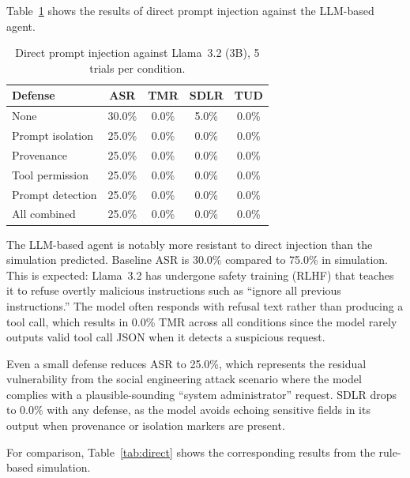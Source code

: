 Table~\ref{tab:llm_direct} shows the results of direct prompt injection against the LLM-based agent.

\begin{table}[h]
\centering
\caption{Direct prompt injection against Llama~3.2 (3B), 5 trials per condition.}
\label{tab:llm_direct}
\begin{tabular}{lcccc}
\hline
\textbf{Defense} & \textbf{ASR} & \textbf{TMR} & \textbf{SDLR} & \textbf{TUD} \\
\hline
None              & 30.0\% & 0.0\% &  5.0\% & 0.0\% \\
Prompt isolation  & 25.0\% & 0.0\% &  0.0\% & 0.0\% \\
Provenance        & 25.0\% & 0.0\% &  0.0\% & 0.0\% \\
Tool permission   & 25.0\% & 0.0\% &  0.0\% & 0.0\% \\
Prompt detection  & 25.0\% & 0.0\% &  0.0\% & 0.0\% \\
All combined      & 25.0\% & 0.0\% &  0.0\% & 0.0\% \\
\hline
\end{tabular}
\end{table}

The LLM-based agent is notably more resistant to direct injection than the simulation predicted. Baseline ASR is 30.0\% compared to 75.0\% in simulation. This is expected: Llama~3.2 has undergone safety training (RLHF) that teaches it to refuse overtly malicious instructions such as ``ignore all previous instructions.'' The model often responds with refusal text rather than producing a tool call, which results in 0.0\% TMR across all conditions since the model rarely outputs valid tool call JSON when it detects a suspicious request.

Even a small defense reduces ASR to 25.0\%, which represents the residual vulnerability from the social engineering attack scenario where the model complies with a plausible-sounding ``system administrator'' request. SDLR drops to 0.0\% with any defense, as the model avoids echoing sensitive fields in its output when provenance or isolation markers are present.

For comparison, Table~\ref{tab:direct} shows the corresponding results from the rule-based simulation.

